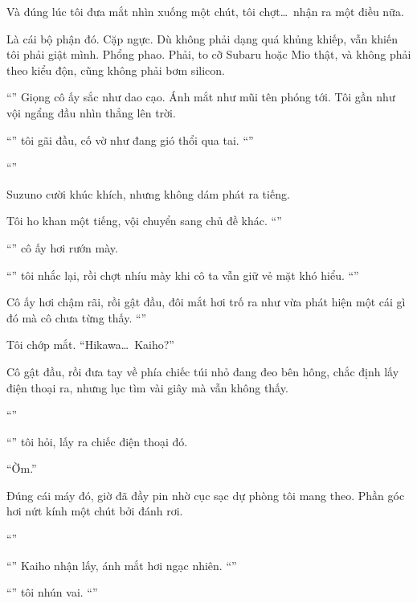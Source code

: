 \documentclass[../main.tex]{subfiles}
\begin{document}
Và đúng lúc tôi đưa mắt nhìn xuống một chút, tôi chợt\dots\ nhận ra một điều nữa.

Là cái bộ phận đó. Cặp ngực. Dù không phải dạng quá khủng khiếp, vẫn khiến tôi phải giật mình. Phổng phao. Phải, to cỡ Subaru hoặc Mio thật, và không phải theo kiểu độn, cũng không phải bơm silicon.

``'' Giọng cô ấy sắc như dao cạo. Ánh mắt như mũi tên phóng tới. Tôi gần như vội ngẩng đầu nhìn thẳng lên trời.

``'' tôi gãi đầu, cố vờ như đang gió thổi qua tai. ``''

``''

Suzuno cười khúc khích, nhưng không dám phát ra tiếng.

Tôi ho khan một tiếng, vội chuyển sang chủ đề khác. ``''

``'' cô ấy hơi rướn mày.

``'' tôi nhắc lại, rồi chợt nhíu mày khi cô ta vẫn giữ vẻ mặt khó hiểu. ``''

Cô ấy hơi chậm rãi, rồi gật đầu, đôi mắt hơi trố ra như vừa phát hiện một cái gì đó mà cô chưa từng thấy. ``''

Tôi chớp mắt. ``Hikawa\dots\ Kaiho?''

Cô gật đầu, rồi đưa tay về phía chiếc túi nhỏ đang đeo bên hông, chắc định lấy điện thoại ra, nhưng lục tìm vài giây mà vẫn không thấy.

``''

``'' tôi hỏi, lấy ra chiếc điện thoại đó.

``Ờm.''

Đúng cái máy đó, giờ đã đầy pin nhờ cục sạc dự phòng tôi mang theo. Phần góc hơi nứt kính một chút bởi đánh rơi.

``''

``'' Kaiho nhận lấy, ánh mắt hơi ngạc nhiên. ``''

``'' tôi nhún vai. ``''
\end{document}
